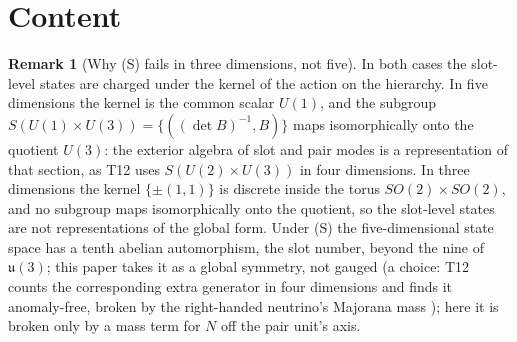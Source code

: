 \documentclass[11pt]{article}
\theoremstyle{definition}
\newtheorem{remark}[theorem]{Remark}
\theoremstyle{plain}
\providecommand{\uu}{}\renewcommand{\uu}{\mathfrak{u}}
\begin{document}
\section{Content}

\begin{remark}[Why (S) fails in three dimensions, not five]\label{c:note.dark-tower-matter.why-s-fails-three-dimensions-not}
In both cases the slot-level states are charged under the kernel of the action on the hierarchy. In five dimensions the kernel is the common scalar $U(1)$, and the subgroup $S(U(1) \times U(3)) = \{((\det B)^{-1}, B)\}$ maps isomorphically onto the quotient $U(3)$: the exterior algebra of slot and pair modes is a representation of that section, as T12 uses $S(U(2) \times U(3))$ in four dimensions. In three dimensions the kernel $\{\pm(1,1)\}$ is discrete inside the torus $SO(2) \times SO(2)$, and no subgroup maps isomorphically onto the quotient, so the slot-level states are not representations of the global form. Under (S) the five-dimensional state space has a tenth abelian automorphism, the slot number, beyond the nine of $\uu(3)$; this paper takes it as a global symmetry, not gauged (a choice: T12 counts the corresponding extra generator in four dimensions and finds it anomaly-free, broken by the right-handed neutrino's Majorana mass \cite[Prop.~5.8]{ButlerT12}); here it is broken only by a mass term for $N$ off the pair unit's axis.
\end{remark}
\end{document}
